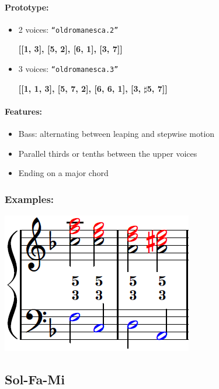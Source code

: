 ﻿\documentclass[11pt, openany]{article}
\begin{document}
\begin{itemize}
\paragraph{Prototype:}
\begin{itemize}
\item 2 voices: \texttt{“oldromanesca.2”}
	\begin{center}
	\textbf{[[1, 3], [5, 2], [6, 1], [3, 7]]}
	\end{center}
\item 3 voices: \texttt{“oldromanesca.3”}
	\begin{center}
 	\textbf{[[1, 1, 3], [5, 7, 2], [6, 6, 1], [3, $\sharp$5, 7]]}
 	\end{center}
\end{itemize}

\paragraph{Features:}
\begin{itemize}
\item Bass:  alternating between leaping and stepwise motion
\item Parallel thirds or tenths between the upper voices
\item Ending on a major chord
\end{itemize}

\subsubsection{Examples:}
\begin{center}
\includegraphics[scale=0.8]{oldromanesca.png}
\end{center}


	\subsection{Sol-Fa-Mi}
	

\end{itemize}
\end{document}
